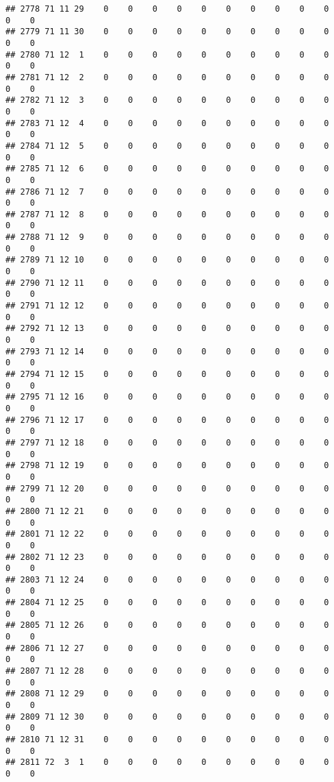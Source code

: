 \documentclass[]{article}
\begin{document}
\begin{verbatim}
## 2778 71 11 29    0    0    0    0    0    0    0    0    0    0    0    0
## 2779 71 11 30    0    0    0    0    0    0    0    0    0    0    0    0
## 2780 71 12  1    0    0    0    0    0    0    0    0    0    0    0    0
## 2781 71 12  2    0    0    0    0    0    0    0    0    0    0    0    0
## 2782 71 12  3    0    0    0    0    0    0    0    0    0    0    0    0
## 2783 71 12  4    0    0    0    0    0    0    0    0    0    0    0    0
## 2784 71 12  5    0    0    0    0    0    0    0    0    0    0    0    0
## 2785 71 12  6    0    0    0    0    0    0    0    0    0    0    0    0
## 2786 71 12  7    0    0    0    0    0    0    0    0    0    0    0    0
## 2787 71 12  8    0    0    0    0    0    0    0    0    0    0    0    0
## 2788 71 12  9    0    0    0    0    0    0    0    0    0    0    0    0
## 2789 71 12 10    0    0    0    0    0    0    0    0    0    0    0    0
## 2790 71 12 11    0    0    0    0    0    0    0    0    0    0    0    0
## 2791 71 12 12    0    0    0    0    0    0    0    0    0    0    0    0
## 2792 71 12 13    0    0    0    0    0    0    0    0    0    0    0    0
## 2793 71 12 14    0    0    0    0    0    0    0    0    0    0    0    0
## 2794 71 12 15    0    0    0    0    0    0    0    0    0    0    0    0
## 2795 71 12 16    0    0    0    0    0    0    0    0    0    0    0    0
## 2796 71 12 17    0    0    0    0    0    0    0    0    0    0    0    0
## 2797 71 12 18    0    0    0    0    0    0    0    0    0    0    0    0
## 2798 71 12 19    0    0    0    0    0    0    0    0    0    0    0    0
## 2799 71 12 20    0    0    0    0    0    0    0    0    0    0    0    0
## 2800 71 12 21    0    0    0    0    0    0    0    0    0    0    0    0
## 2801 71 12 22    0    0    0    0    0    0    0    0    0    0    0    0
## 2802 71 12 23    0    0    0    0    0    0    0    0    0    0    0    0
## 2803 71 12 24    0    0    0    0    0    0    0    0    0    0    0    0
## 2804 71 12 25    0    0    0    0    0    0    0    0    0    0    0    0
## 2805 71 12 26    0    0    0    0    0    0    0    0    0    0    0    0
## 2806 71 12 27    0    0    0    0    0    0    0    0    0    0    0    0
## 2807 71 12 28    0    0    0    0    0    0    0    0    0    0    0    0
## 2808 71 12 29    0    0    0    0    0    0    0    0    0    0    0    0
## 2809 71 12 30    0    0    0    0    0    0    0    0    0    0    0    0
## 2810 71 12 31    0    0    0    0    0    0    0    0    0    0    0    0
## 2811 72  3  1    0    0    0    0    0    0    0    0    0    0    0    0

\end{verbatim}
\end{document}
